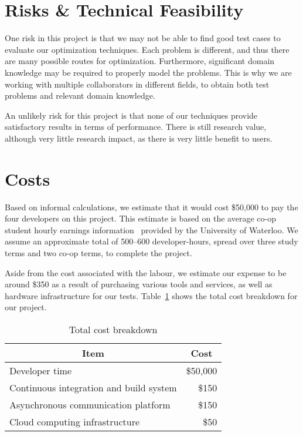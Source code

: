 \documentclass[11pt]{article}
\begin{document}
\section{Risks \& Technical Feasibility}\label{sec:risks}
One risk in this project is that we may not be able to find good test
cases to evaluate our optimization techniques. Each problem is
different, and thus there are many possible routes for optimization.
Furthermore, significant domain knowledge may be required to properly
model the problems. This is why we are working with multiple
collaborators in different fields, to obtain both test problems and
relevant domain knowledge.

An unlikely risk for this project is that none of our techniques
provide satisfactory results in terms of performance. There is still
research value, although very little research impact, as there is very
little benefit to users.

\section{Costs}\label{sec:costs}
Based on informal calculations, we estimate that it would cost \$50,000
to pay the four developers on this project. This estimate is based on
the average co-op student hourly earnings information~\cite{ref:ceca}
provided by the University of Waterloo. We assume an approximate total
of 500--600 developer-hours, spread over three study terms and two
co-op terms, to complete the project.

Aside from the cost associated with the labour, we estimate our expense
to be around \$350 as a result of purchasing various tools and
services, as well as hardware infrastructure for our tests.
Table~\ref{tbl:costbreakdown} shows the total cost breakdown for our
project.

\begin{table}
  \captionsetup{margin=30pt}
  \caption{Total cost breakdown}\label{tbl:costbreakdown}
  \centering
  \begin{tabular}{lr}
    \hline
    \multicolumn{1}{c}{\textbf{Item}} &
    \multicolumn{1}{c}{\textbf{Cost}} \\
    \hline
      Developer time & \$50,000 \\
      Continuous integration and build system & \$150 \\
      Asynchronous communication platform & \$150 \\
      Cloud computing infrastructure & \$50 \\
  \end{tabular}
\end{table}
\end{document}

